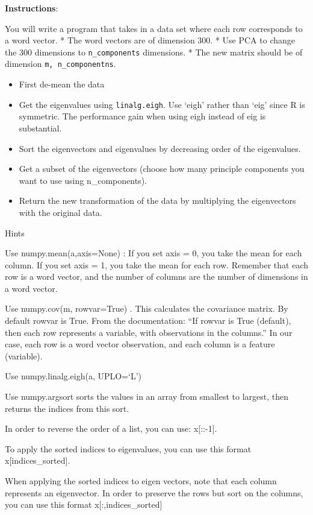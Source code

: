 \documentclass[11pt]{article}
\providecommand{\tightlist}{%
      \setlength{\itemsep}{0pt}\setlength{\parskip}{0pt}}
\begin{document}
    \textbf{Instructions}:

You will write a program that takes in a data set where each row
corresponds to a word vector. * The word vectors are of dimension 300. *
Use PCA to change the 300 dimensions to \texttt{n\_components}
dimensions. * The new matrix should be of dimension
\texttt{m,\ n\_componentns}.

\begin{itemize}
\tightlist
\item
  First de-mean the data
\item
  Get the eigenvalues using \texttt{linalg.eigh}. Use `eigh' rather than
  `eig' since R is symmetric. The performance gain when using eigh
  instead of eig is substantial.
\item
  Sort the eigenvectors and eigenvalues by decreasing order of the
  eigenvalues.
\item
  Get a subset of the eigenvectors (choose how many principle components
  you want to use using n\_components).
\item
  Return the new transformation of the data by multiplying the
  eigenvectors with the original data.
\end{itemize}

    Hints

Use numpy.mean(a,axis=None) : If you set axis = 0, you take the mean for
each column. If you set axis = 1, you take the mean for each row.
Remember that each row is a word vector, and the number of columns are
the number of dimensions in a word vector.

Use numpy.cov(m, rowvar=True) . This calculates the covariance matrix.
By default rowvar is True. From the documentation: ``If rowvar is True
(default), then each row represents a variable, with observations in the
columns.'' In our case, each row is a word vector observation, and each
column is a feature (variable).

Use numpy.linalg.eigh(a, UPLO=`L')

Use numpy.argsort sorts the values in an array from smallest to largest,
then returns the indices from this sort.

In order to reverse the order of a list, you can use: x{[}::-1{]}.

To apply the sorted indices to eigenvalues, you can use this format
x{[}indices\_sorted{]}.

When applying the sorted indices to eigen vectors, note that each column
represents an eigenvector. In order to preserve the rows but sort on the
columns, you can use this format x{[}:,indices\_sorted{]}
\end{document}
